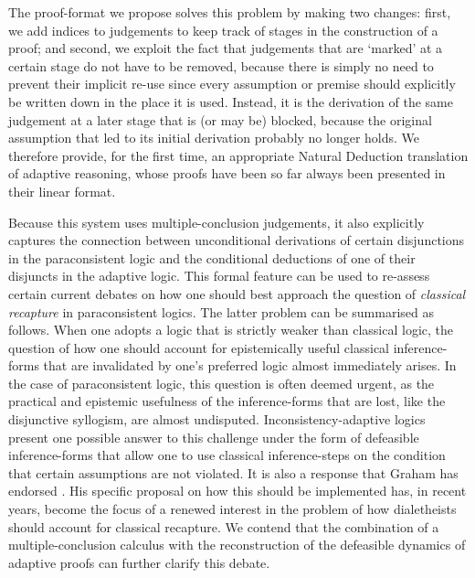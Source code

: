 \documentclass[]{article}
\begin{document}
The proof-format we propose solves this problem by making two changes: first, we add indices to judgements to keep track of stages in the construction of a proof; and second, we exploit the fact that judgements that are `marked' at a certain stage do not have to be removed, because there is simply no need to prevent their implicit re-use since every assumption or premise should explicitly be written down in the place it is used. Instead, it is the derivation of the same judgement at a later stage that is (or may be) blocked, because the original assumption that led to its initial derivation probably no longer holds. We therefore provide, for the first time, an appropriate Natural Deduction translation of adaptive reasoning, whose proofs have been so far always been presented in their linear format. 

Because this system uses multiple-conclusion judgements, it also explicitly captures the connection between unconditional derivations of certain disjunctions in the paraconsistent logic and the conditional deductions of one of their disjuncts in the adaptive logic. This formal feature can be used to re-assess certain current debates on how one should best approach the question of \textit{classical recapture} in paraconsistent logics. The latter problem can be summarised as follows. When one adopts a logic that is strictly weaker than classical logic, the question of how one should account for epistemically useful classical inference-forms that are invalidated by one's preferred logic almost immediately arises. In the case of paraconsistent logic, this question is often deemed urgent, as the practical and epistemic usefulness of the inference-forms that are lost, like the disjunctive syllogism, are almost undisputed. Inconsistency-adaptive logics present one possible answer to this challenge under the form of defeasible inference-forms that allow one to use classical inference-steps on the condition that certain assumptions are not violated. It is also a response that Graham has endorsed \cite{GP:LPm}. His specific proposal on how this should be implemented has, in recent years, become the focus of a renewed interest in the problem of how dialetheists should account for classical recapture. We contend that the combination of a multiple-conclusion calculus with the reconstruction of the defeasible dynamics of adaptive proofs can further clarify this debate.
\end{document}
